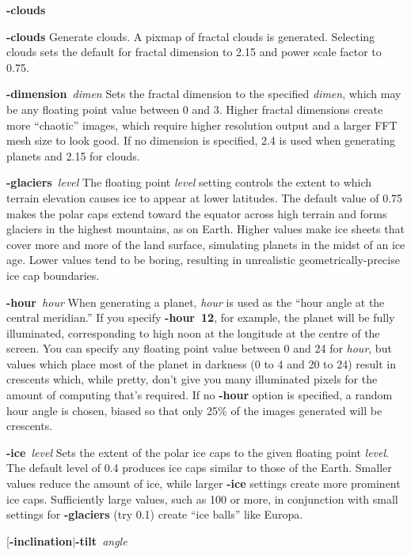 \begin{TPlist}{{\bf -clouds}}
\item[{{\bf -clouds}}]
Generate clouds.  A pixmap of fractal clouds is generated.  Selecting clouds
sets the default for fractal dimension to 2.15 and power scale factor
to 0.75.
\item[{{\bf -dimension}{\it \ dimen}
}]
Sets the fractal dimension to the specified
{\it dimen}{\rm ,}
which may be any floating point value between 0 and 3.  Higher fractal
dimensions create more ``chaotic'' images, which require higher
resolution output and a larger FFT mesh size to look good.  If no
dimension is specified, 2.4 is used when generating planets and 2.15
for clouds.
\item[{{\bf -glaciers}{\it \ level}
}]
The floating point
{\it level}
setting controls the extent to which terrain elevation causes ice to
appear at lower latitudes.  The default value of 0.75 makes the polar
caps extend toward the equator across high terrain and forms glaciers
in the highest mountains, as on Earth.  Higher values make ice sheets
that cover more and more of the land surface, simulating planets in the
midst of an ice age.  Lower values tend to be boring, resulting in
unrealistic geometrically-precise ice cap boundaries.
\item[{{\bf -hour}{\it \ hour}
}]
When generating a planet,
{\it hour}
is used as the ``hour angle at the central meridian.''  If you specify
{\bf -hour\ 12}{\rm ,}
for example, the planet will be fully illuminated, corresponding to
high noon at the longitude at the centre of the screen.  You can
specify any floating point value between 0 and 24 for
{\it hour}{\rm ,}
but values which place most of the planet in darkness (0 to 4 and 20
to 24) result in crescents which, while pretty, don't give you many
illuminated pixels for the amount of computing that's required.  If no
{\bf -hour}
option is specified, a random hour angle is chosen, biased so that
only 25\% of the images generated will be crescents.
\item[{{\bf -ice}{\it \ level}
}]
Sets the extent of the polar ice caps to the given floating point
{\it level}{\rm .}
The default level of 0.4 produces ice caps similar to those of the Earth.
Smaller values reduce the amount of ice, while larger
{\bf -ice}
settings create more prominent ice caps.  Sufficiently large values,
such as 100 or more, in conjunction with small settings for
{\bf -glaciers}
(try 0.1) create ``ice balls'' like Europa.
\item[{{\bf -inclination$|$-tilt}{\it \ angle}
}
\end{TPlist}
